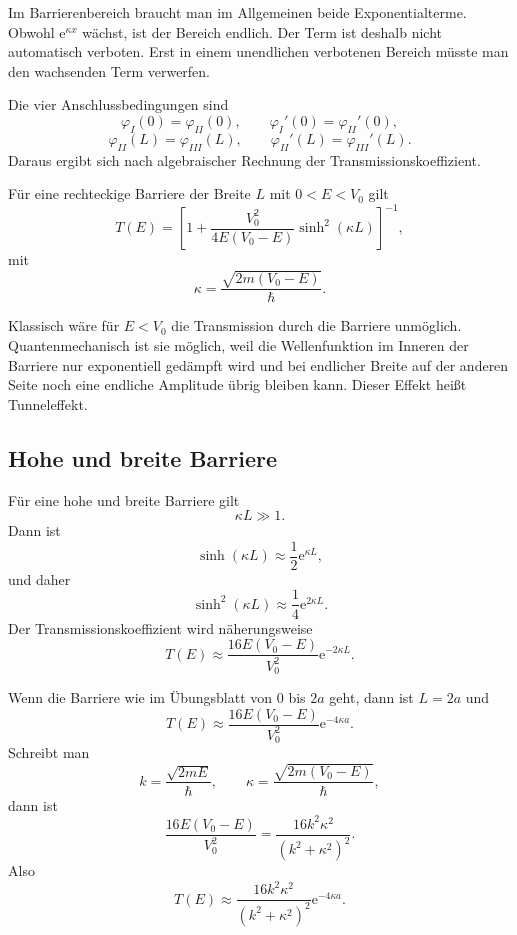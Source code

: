\begin{notebox}
Im Barrierenbereich braucht man im Allgemeinen beide Exponentialterme. Obwohl $\mathrm{e}^{\kappa x}$ wächst, ist der Bereich endlich. Der Term ist deshalb nicht automatisch verboten. Erst in einem unendlichen verbotenen Bereich müsste man den wachsenden Term verwerfen.
\end{notebox}

Die vier Anschlussbedingungen sind
\[
    \varphi_I(0)=\varphi_{II}(0),
    \qquad
    \varphi_I'(0)=\varphi_{II}'(0),
\]
\[
    \varphi_{II}(L)=\varphi_{III}(L),
    \qquad
    \varphi_{II}'(L)=\varphi_{III}'(L).
\]
Daraus ergibt sich nach algebraischer Rechnung der Transmissionskoeffizient.

\begin{formulabox}
Für eine rechteckige Barriere der Breite $L$ mit $0<E<V_0$ gilt
\[
    T(E)=\left[1+\frac{V_0^2}{4E(V_0-E)}\sinh^2(\kappa L)\right]^{-1},
\]
mit
\[
    \kappa=\frac{\sqrt{2m(V_0-E)}}{\hbar}.
\]
\end{formulabox}

\begin{conceptbox}
Klassisch wäre für $E<V_0$ die Transmission durch die Barriere unmöglich. Quantenmechanisch ist sie möglich, weil die Wellenfunktion im Inneren der Barriere nur exponentiell gedämpft wird und bei endlicher Breite auf der anderen Seite noch eine endliche Amplitude übrig bleiben kann. Dieser Effekt heißt Tunneleffekt.
\end{conceptbox}

\subsection{Hohe und breite Barriere}

Für eine hohe und breite Barriere gilt
\[
    \kappa L\gg 1.
\]
Dann ist
\[
    \sinh(\kappa L)\approx \frac{1}{2}\mathrm{e}^{\kappa L},
\]
und daher
\[
    \sinh^2(\kappa L)\approx\frac{1}{4}\mathrm{e}^{2\kappa L}.
\]
Der Transmissionskoeffizient wird näherungsweise
\[
    T(E)\approx
    \frac{16E(V_0-E)}{V_0^2}\mathrm{e}^{-2\kappa L}.
\]

Wenn die Barriere wie im Übungsblatt von $0$ bis $2a$ geht, dann ist $L=2a$ und
\[
    T(E)\approx
    \frac{16E(V_0-E)}{V_0^2}\mathrm{e}^{-4\kappa a}.
\]
Schreibt man
\[
    k=\frac{\sqrt{2mE}}{\hbar},
    \qquad
    \kappa=\frac{\sqrt{2m(V_0-E)}}{\hbar},
\]
dann ist
\[
    \frac{16E(V_0-E)}{V_0^2}
    =\frac{16k^2\kappa^2}{(k^2+\kappa^2)^2}.
\]
Also
\[
    T(E)\approx
    \frac{16k^2\kappa^2}{(k^2+\kappa^2)^2}\mathrm{e}^{-4\kappa a}.
\]

